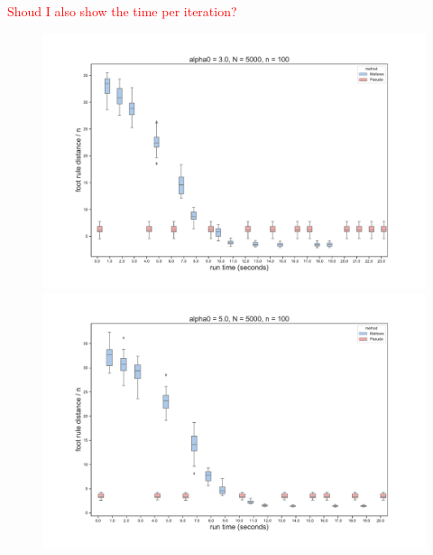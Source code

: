 \documentclass[11pt, oneside]{article}   	%
\begin{document}
\textcolor{red}{Shoud I also show the time per iteration?}
\begin{figure}[hbt!]
	\begin{minipage}[t]{.32\linewidth}
		\centering
		\includegraphics[width=\linewidth]{figures/full_time_simulation/box_alpha03N5000n100}
	\end{minipage}
	\begin{minipage}[t]{.32\linewidth}
		\centering
		\includegraphics[width=\linewidth]{figures/full_time_simulation/box_alpha05N5000n100}
		

\end{minipage}
\end{figure}
\end{document}
